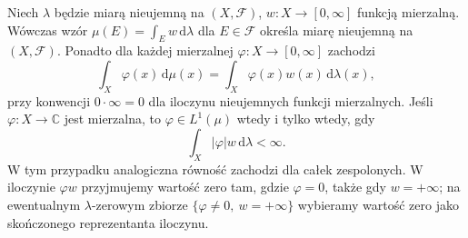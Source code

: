 \begin{lemat}
\label{lem:integration-density-18}
Niech $\lambda$ będzie miarą nieujemną na $(X,\mathcal F)$,
$w:X\to[0,\infty]$ funkcją mierzalną. Wówczas wzór
$\mu(E)=\int_Ew\,\mathrm d\lambda$ dla $E\in\mathcal F$
określa miarę nieujemną na $(X,\mathcal F)$.
Ponadto dla każdej mierzalnej $\varphi:X\to[0,\infty]$
zachodzi
\begin{equation}\label{eq:integration-density-18}
\int_X\varphi(x)\,\mathrm d\mu(x)
=\int_X\varphi(x)w(x)\,\mathrm d\lambda(x),
\end{equation}
przy konwencji $0\cdot\infty=0$ dla iloczynu
nieujemnych funkcji mierzalnych. Jeśli $\varphi:X\to\mathbb C$ jest mierzalna, to
$\varphi\in L^1(\mu)$ wtedy i tylko wtedy, gdy
\[
 \int_X|\varphi|w\,\mathrm d\lambda<\infty.
\]
W tym przypadku analogiczna równość zachodzi dla całek
zespolonych. W iloczynie $\varphi w$ przyjmujemy wartość
zero tam, gdzie $\varphi=0$, także gdy $w=+\infty$;
na ewentualnym $\lambda$-zerowym zbiorze
$\{\varphi\ne0,\ w=+\infty\}$ wybieramy wartość zero
jako skończonego reprezentanta iloczynu.
\end{lemat}
